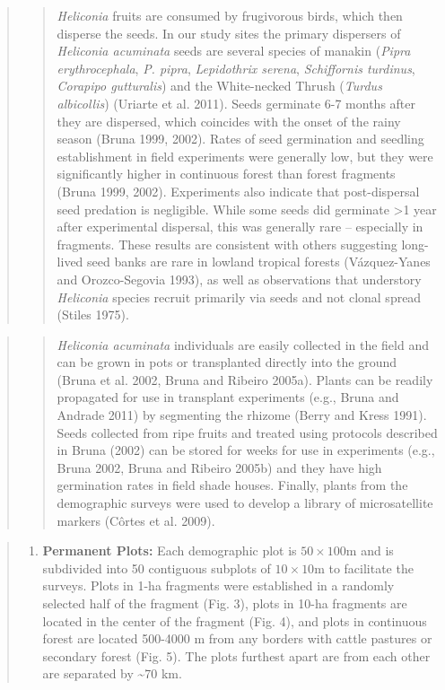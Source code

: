 \documentclass[
  man, donotrepeattitle,floatsintext]{apa6}
\providecommand{\tightlist}{%
  \setlength{\itemsep}{0pt}\setlength{\parskip}{0pt}}
\begin{document}
\begin{quote}
\begin{quote}
\emph{Heliconia} fruits are consumed by frugivorous birds, which then disperse the seeds. In our study sites the primary dispersers of \emph{Heliconia acuminata} seeds are several species of manakin (\emph{Pipra erythrocephala}, \emph{P. pipra}, \emph{Lepidothrix serena}, \emph{Schiffornis turdinus}, \emph{Corapipo gutturalis}) and the White-necked Thrush (\emph{Turdus albicollis}) (Uriarte et al. 2011). Seeds germinate 6-7 months after they are dispersed, which coincides with the onset of the rainy season (Bruna 1999, 2002). Rates of seed germination and seedling establishment in field experiments were generally low, but they were significantly higher in continuous forest than forest fragments (Bruna 1999, 2002). Experiments also indicate that post-dispersal seed predation is negligible. While some seeds did germinate \textgreater1 year after experimental dispersal, this was generally rare -- especially in fragments. These results are consistent with others suggesting long-lived seed banks are rare in lowland tropical forests (Vázquez-Yanes and Orozco-Segovia 1993), as well as observations that understory \emph{Heliconia} species recruit primarily via seeds and not clonal spread (Stiles 1975).
\end{quote}
\end{quote}

\begin{quote}
\begin{quote}
\emph{Heliconia acuminata} individuals are easily collected in the field and can be grown in pots or transplanted directly into the ground (Bruna et al. 2002, Bruna and Ribeiro 2005a). Plants can be readily propagated for use in transplant experiments (e.g., Bruna and Andrade 2011) by segmenting the rhizome (Berry and Kress 1991). Seeds collected from ripe fruits and treated using protocols described in Bruna (2002) can be stored for weeks for use in experiments (e.g., Bruna 2002, Bruna and Ribeiro 2005b) and they have high germination rates in field shade houses. Finally, plants from the demographic surveys were used to develop a library of microsatellite markers (Côrtes et al. 2009).
\end{quote}
\end{quote}

\begin{quote}
\begin{enumerate}
\def\labelenumi{\alph{enumi}.}
\setcounter{enumi}{1}
\tightlist
\item
  \textbf{Permanent Plots:} Each demographic plot is \(50\times100\)m and is subdivided into 50 contiguous subplots of \(10\times10\)m to facilitate the surveys. Plots in 1-ha fragments were established in a randomly selected half of the fragment (Fig. 3), plots in 10-ha fragments are located in the center of the fragment (Fig. 4), and plots in continuous forest are located 500-4000 m from any borders with cattle pastures or secondary forest (Fig. 5). The plots furthest apart are from each other are separated by \textasciitilde70 km.
\end{enumerate}
\end{quote}
\end{document}
